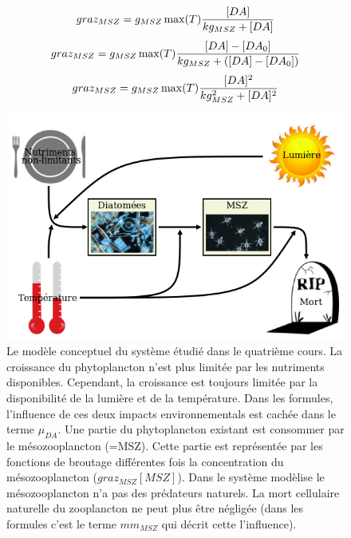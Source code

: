 {\begin{equation}
  graz_{MSZ} = g_{MSZ} \max(T) {{[DA]}\over{kg_{MSZ}+[DA]}}
  \label{eq:partie1GrazMic}
\end{equation}
\begin{equation}
  graz_{MSZ} = g_{MSZ} \max(T) {{[DA]-[DA_0]}\over{kg_{MSZ}+([DA]-[DA_0])}}
  \label{eq:partie1GrazMicSeul}
\end{equation}
\begin{equation}
  graz_{MSZ} = g_{MSZ} \max(T) {{[DA]^2}\over{kg_{MSZ}^2+[DA]^2}}
  \label{eq:partie1GrazHol}
\end{equation}

\begin{figure}[h!]
  \includegraphics[width=\textwidth]{partie1/diagrammeConceptuel.png}
  \caption{Le modèle conceptuel du système étudié dans le quatrième cours. La croissance du phytoplancton
n'est plus limitée par les nutriments disponibles. Cependant, la croissance est toujours limitée par la
disponibilité de la lumière et de la température. Dans les formules, l'influence de ces deux impacts
environnementals est cachée dans le terme $\mu_{DA}$. Une partie du phytoplancton existant est consommer
par le mésozooplancton (=MSZ). Cette partie est représentée par les fonctions de broutage
différentes fois la concentration du mésozooplancton ($graz_{MSZ}[MSZ]$). Dans le système modèlise
le mésozooplancton n'a pas des prédateurs naturels. La mort cellulaire naturelle du zooplancton ne peut plus
être négligée (dans les formules c'est le terme $mm_{MSZ}$ qui décrit cette l'influence).
}
  \label{fig:partie1DiagConcept}
\end{figure}

\par{

}}
